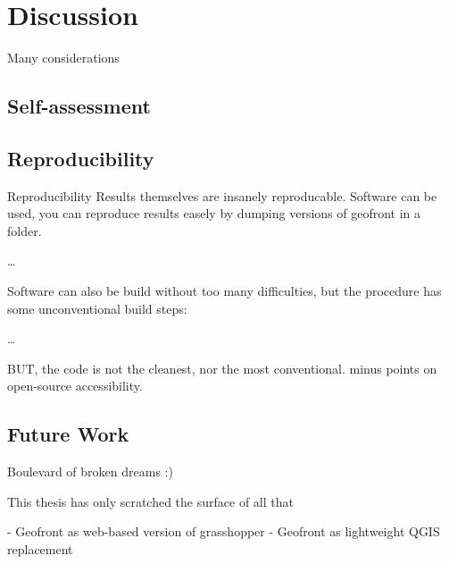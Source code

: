 \chapter{Discussion}%
Many considerations








\section{Self-assessment}


\section{Reproducibility}
Reproducibility
Results themselves are insanely reproducable.
Software can be used, you can reproduce results easely by dumping versions of geofront in 
a folder.

\dots

Software can also be build without too many difficulties, but the procedure has some unconventional build steps: 

\dots

BUT, the code is not the cleanest, nor the most conventional. minus points on open-source accessibility.

\section{Future Work}
Boulevard of broken dreams :) 

This thesis has only scratched the surface of all that

- Geofront as web-based version of grasshopper
- Geofront as lightweight QGIS replacement 

